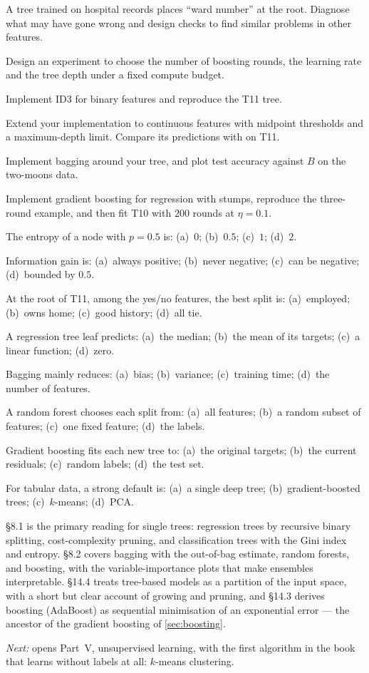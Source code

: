 \dpr A tree trained on hospital records places ``ward number'' at the root.
Diagnose what may have gone wrong and design checks to find similar problems in
other features.

\dpr Design an experiment to choose the number of boosting rounds, the learning
rate and the tree depth under a fixed compute budget.


\pe Implement ID3 for binary features and reproduce the T11 tree.

\pe Extend your implementation to continuous features with midpoint thresholds and
a maximum-depth limit. Compare its predictions with 
on T11.

\pe Implement bagging around your tree, and plot test accuracy against $B$ on the
two-moons data.

\pe Implement gradient boosting for regression with stumps, reproduce the
three-round example, and then fit T10 with $200$ rounds at $\eta = 0.1$.


\qz The entropy of a node with $p = 0.5$ is: (a)~$0$; (b)~$0.5$; (c)~$1$;
(d)~$2$.

\qz Information gain is: (a)~always positive; (b)~never negative; (c)~can be
negative; (d)~bounded by $0.5$.

\qz At the root of T11, among the yes/no features, the best split is:
(a)~employed; (b)~owns home; (c)~good history; (d)~all tie.

\qz A regression tree leaf predicts: (a)~the median; (b)~the mean of its
targets; (c)~a linear function; (d)~zero.

\qz Bagging mainly reduces: (a)~bias; (b)~variance; (c)~training time;
(d)~the number of features.

\qz A random forest chooses each split from: (a)~all features; (b)~a random
subset of features; (c)~one fixed feature; (d)~the labels.

\qz Gradient boosting fits each new tree to: (a)~the original targets; (b)~the
current residuals; (c)~random labels; (d)~the test set.

\qz For tabular data, a strong default is: (a)~a single deep tree;
(b)~gradient-boosted trees; (c)~$k$-means; (d)~PCA.

\furtherreading

\textcite{james2021} §8.1 is the primary reading for single trees: regression
trees by recursive binary splitting, cost-complexity pruning, and classification
trees with the Gini index and entropy. §8.2 covers bagging with the out-of-bag
estimate, random forests, and boosting, with the variable-importance plots that
make ensembles interpretable. \textcite{bishop2006} §14.4 treats tree-based models
as a partition of the input space, with a short but clear account of growing and
pruning, and §14.3 derives boosting (AdaBoost) as sequential minimisation of an
exponential error --- the ancestor of the gradient boosting of
\cref{sec:boosting}.

\bigskip
\noindent\emph{Next:}  opens Part~V, unsupervised learning, with
the first algorithm in the book that learns without labels at all: $k$-means
clustering.
